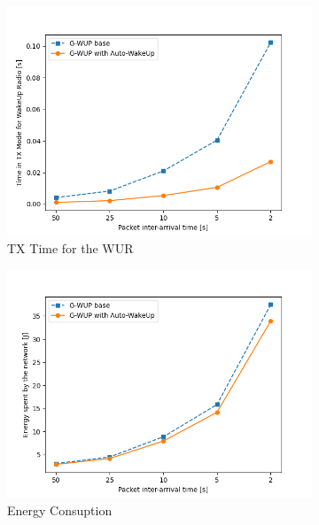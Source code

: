\begin{figure}[H]
  \begin{subfigure}[t]{0.49\linewidth}
    \includegraphics[width=1.1\linewidth]{Contents/Images/graphs/autoWakeUp/tx_time.png}
    \caption{TX Time for the WUR}
    \label{fig:TXTime_1}
  \end{subfigure}
  \begin{subfigure}[t]{0.49\linewidth}
    \includegraphics[width=1.1\linewidth]{Contents/Images/graphs/autoWakeUp/energySpent.png}
    \caption{Energy Consuption}
    \label{fig:EnergySpent_1}
  \end{subfigure}
  \begin{subfigure}[t]{0.49\linewidth}

\end{subfigure}
\end{figure}
